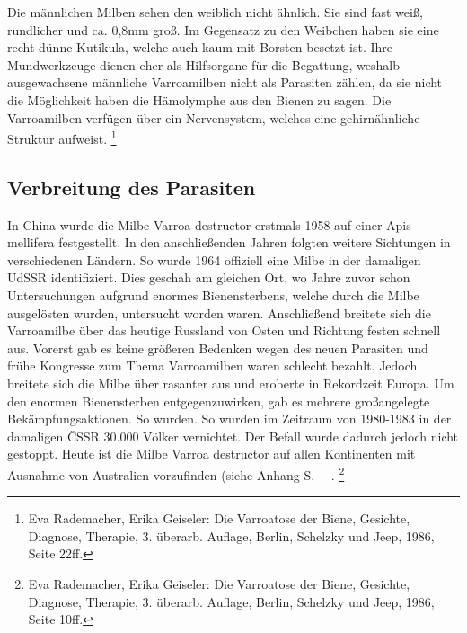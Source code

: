 \documentclass[11pt,a4paper]{article}
\begin{document}
Die männlichen Milben sehen den weiblich nicht ähnlich. Sie sind fast weiß, rundlicher und ca. 0,8mm groß. Im Gegensatz zu den Weibchen haben sie eine recht dünne Kutikula, welche auch kaum mit Borsten besetzt ist. Ihre Mundwerkzeuge dienen eher als Hilfsorgane für die Begattung, weshalb ausgewachsene männliche Varroamilben nicht als Parasiten zählen, da sie nicht die Möglichkeit haben die Hämolymphe aus den Bienen zu sagen.
Die Varroamilben verfügen über ein Nervensystem, welches eine gehirnähnliche Struktur aufweist. \footnote{Eva Rademacher, Erika Geiseler: Die Varroatose der Biene, Gesichte, Diagnose, Therapie, 3. überarb. Auflage, Berlin, Schelzky und Jeep, 1986, Seite 22ff.}

\subsection{Verbreitung des Parasiten}
In China wurde die Milbe Varroa destructor erstmals 1958 auf einer Apis mellifera festgestellt. In den anschließenden Jahren folgten weitere Sichtungen in verschiedenen Ländern. So wurde 1964 offiziell eine Milbe in der damaligen UdSSR identifiziert. Dies geschah am gleichen Ort, wo Jahre zuvor schon Untersuchungen aufgrund enormes Bienensterbens, welche durch die Milbe ausgelösten wurden, untersucht worden waren. Anschließend breitete sich die Varroamilbe über das heutige Russland von Osten und Richtung festen schnell aus. Vorerst gab es keine größeren Bedenken wegen des neuen Parasiten und frühe Kongresse zum Thema Varroamilben waren schlecht bezahlt. Jedoch breitete sich die Milbe über rasanter aus und eroberte in Rekordzeit Europa. Um den enormen Bienensterben entgegenzuwirken, gab es mehrere großangelegte Bekämpfungsaktionen. So wurden. So wurden im Zeitraum von 1980-1983 in der damaligen ČSSR 30.000 Völker vernichtet. Der Befall wurde dadurch jedoch nicht gestoppt. Heute ist die Milbe Varroa destructor auf allen Kontinenten mit Ausnahme von Australien vorzufinden (siehe Anhang S. ---. \footnote{Eva Rademacher, Erika Geiseler: Die Varroatose der Biene, Gesichte, Diagnose, Therapie, 3. überarb. Auflage, Berlin, Schelzky und Jeep, 1986, Seite 10ff.}
\end{document}
